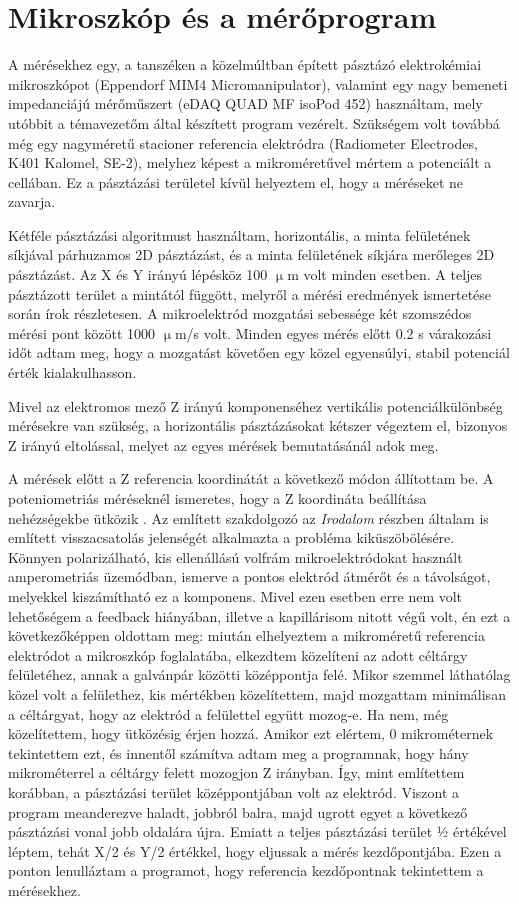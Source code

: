 \section{Mikroszkóp és a mérőprogram}

A mérésekhez egy, a tanszéken a közelmúltban épített pásztázó elektrokémiai mikroszkópot (Eppendorf MIM4 Micromanipulator), valamint egy nagy bemeneti impedanciájú mérőműszert (eDAQ QUAD MF isoPod 452) használtam, mely utóbbit a témavezetőm által készített program vezérelt. Szükségem volt továbbá még egy nagyméretű stacioner referencia elektródra (Radiometer Electrodes, K401 Kalomel, SE-2), melyhez képest a mikroméretűvel mértem a potenciált a cellában. Ez a pásztázási területel kívül helyeztem el, hogy a méréseket ne zavarja. 

Kétféle pásztázási algoritmust használtam, horizontális, a minta felületének síkjával párhuzamos 2D pásztázást, és a minta felületének síkjára merőleges 2D pásztázást. Az X és Y irányú lépésköz 100 $\upmu$m volt minden esetben. A teljes pásztázott terület a mintától függött, melyről a mérési eredmények ismertetése során írok részletesen. A mikroelektród mozgatási sebessége két szomszédos mérési pont között 1000 $\upmu$m/s volt. Minden egyes mérés előtt 0.2 s várakozási időt adtam meg, hogy a mozgatást követően egy közel egyensúlyi, stabil potenciál érték kialakulhasson.  

Mivel az elektromos mező Z irányú komponenséhez vertikális potenciálkülönbség mérésekre van szükség, a horizontális pásztázásokat kétszer végeztem el, bizonyos Z irányú eltolással, melyet az egyes mérések bemutatásánál adok meg.

A mérések előtt a Z referencia koordinátát a következő módon állítottam be. A poteniometriás méréseknél ismeretes, hogy a Z koordináta beállítása nehézségekbe ütközik \cite{Klucsik János Msc Szakdolgozata}. Az említett szakdolgozó az \emph{Irodalom} részben általam is említett visszacsatolás jelenségét alkalmazta a probléma kiküszöbölésére. Könnyen polarizálható, kis ellenállású volfrám mikroelektródokat használt amperometriás üzemódban, ismerve a pontos elektród átmérőt és a távolságot, melyekkel kiszámítható ez a komponens. Mivel ezen esetben erre nem volt lehetőségem a feedback hiányában, illetve a kapillárisom nitott végű volt, én ezt a következőképpen oldottam meg: miután elhelyeztem a mikroméretű referencia elektródot a mikroszkóp foglalatába, elkezdtem közelíteni az adott céltárgy felületéhez, annak a galvánpár közötti középpontja felé. Mikor szemmel láthatólag közel volt a felülethez, kis mértékben közelítettem, majd mozgattam minimálisan a céltárgyat, hogy az elektród a felülettel együtt mozog-e. Ha nem, még közelítettem, hogy ütközésig érjen hozzá. Amikor ezt elértem, 0 mikrométernek tekintettem ezt, és innentől számítva adtam meg a programnak, hogy hány mikrométerrel a céltárgy felett mozogjon Z irányban. Így, mint említettem korábban, a pásztázási terület középpontjában volt az elektród. Viszont a program meanderezve haladt, jobbról balra, majd ugrott egyet a következő pásztázási vonal jobb oldalára újra.  Emiatt a teljes pásztázási terület ½ értékével léptem, tehát X/2 és Y/2 értékkel, hogy eljussak a mérés kezdőpontjába. Ezen a ponton lenulláztam a programot, hogy referencia kezdőpontnak tekintettem a mérésekhez.

